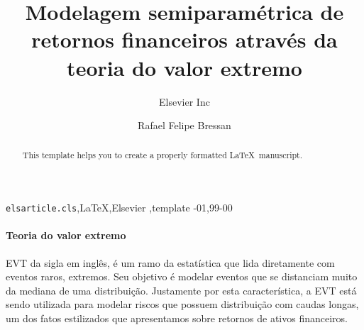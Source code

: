 \documentclass[review]{elsarticle}
\theoremstyle{definition}
\begin{document}
\begin{frontmatter}

\title{Modelagem semiparamétrica de retornos financeiros através da teoria do valor extremo}


\author[mymainaddress,mysecondaryaddress]{Elsevier Inc}

\author[mymainaddress]{Rafael Felipe Bressan}

\address[mymainaddress]{Avenida Madre Benvenuta, 2007 - Santa Mônica Florianópolis - SC 88035-901}
\address[mysecondaryaddress]{360 Park Avenue South, New York}

\begin{abstract}
This template helps you to create a properly formatted \LaTeX\ manuscript.
\end{abstract}

\begin{keyword}
\texttt{elsarticle.cls}\sep \LaTeX\sep Elsevier \sep template
-01\sep  99-00
\end{keyword}

\end{frontmatter}

\linenumbers

\paragraph{Teoria do valor extremo} EVT da sigla em inglês, é um ramo da estatística que lida diretamente com eventos raros, extremos. Seu objetivo é modelar eventos que se distanciam muito da mediana de uma distribuição. Justamente por esta característica, a EVT está sendo utilizada para modelar riscos que possuem distribuição com caudas longas, um dos fatos estilizados que apresentamos sobre retornos de ativos financeiros.
\end{document}
